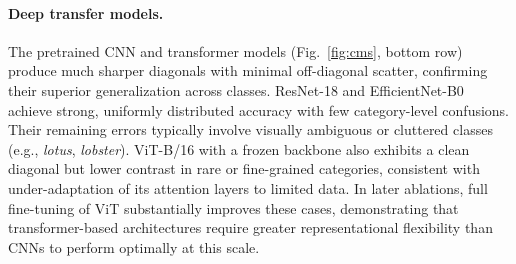 \documentclass[11pt]{article}
\begin{document}
\paragraph{Deep transfer models.}
The pretrained CNN and transformer models (Fig.~\ref{fig:cms}, bottom row) produce much sharper diagonals with minimal
off-diagonal scatter, confirming their superior generalization across classes. ResNet-18 and EfficientNet-B0 achieve
strong, uniformly distributed accuracy with few category-level confusions. Their remaining errors typically involve
visually ambiguous or cluttered classes (e.g., \emph{lotus}, \emph{lobster}). ViT-B/16 with a frozen backbone also
exhibits a clean diagonal but lower contrast in rare or fine-grained categories, consistent with under-adaptation of
its attention layers to limited data. In later ablations, full fine-tuning of ViT substantially improves these cases,
demonstrating that transformer-based architectures require greater representational flexibility than CNNs to perform
optimally at this scale.
\end{document}

